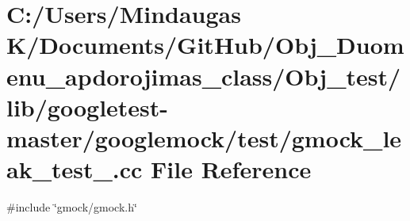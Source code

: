 \hypertarget{_obj__test_2lib_2googletest-master_2googlemock_2test_2gmock__leak__test___8cc}{}\section{C\+:/\+Users/\+Mindaugas K/\+Documents/\+Git\+Hub/\+Obj\+\_\+\+Duomenu\+\_\+apdorojimas\+\_\+class/\+Obj\+\_\+test/lib/googletest-\/master/googlemock/test/gmock\+\_\+leak\+\_\+test\+\_\+.cc File Reference}
\label{_obj__test_2lib_2googletest-master_2googlemock_2test_2gmock__leak__test___8cc}
{\ttfamily \#include \char`\"{}gmock/gmock.\+h\char`\"{}}\newline
